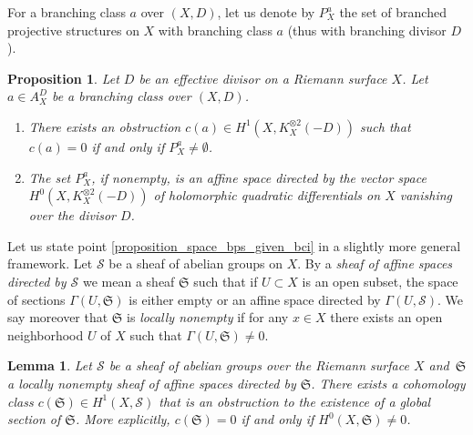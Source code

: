 \documentclass[JEP,XML,SOM,Unicode,NoEqCountersInSection,published]{cedram}
\theoremstyle{definition}
\theoremstyle{plain}
\newtheorem{proposition}[definition]{Proposition}
\newtheorem{lemma}[definition]{Lemma}
\begin{document}
For a branching class $a$ over $(X, D)$, let us denote by $P^a_X$ the set of branched projective structures on $X$ with branching class $a$ (thus with branching divisor $D$).

\begin{proposition}\label{proposition_space_bps_given_bc}
Let $D$ be an effective divisor on a Riemann surface $X$. Let $a \in A_X^D$ be a branching class over $(X, D)$.
\begin{enumerate}
\item\label{proposition_space_bps_given_bci}
There exists an obstruction $c(a) \in H^1\left(X, K_X^{\otimes 2}(-D)\right)$ such that $c(a)=0$ if and only if $P_X^a \neq \emptyset$.
\item\label{proposition_space_bps_given_bcii}
The set $P_X^a$, if nonempty, is an affine space directed by the vector space $H^0\left(X, K_X^{\otimes 2}(-D)\right)$ of holomorphic quadratic differentials on $X$ vanishing over the divisor $D$.
\end{enumerate}
\end{proposition}

Let us state point \eqref{proposition_space_bps_given_bci} in a slightly more general framework.
Let $\mathcal S$ be a sheaf of abelian groups on $X$.
By a \emph{sheaf of affine spaces directed by $\mathcal S$} we mean a sheaf $\mathfrak S$ such that if $U \subset X$ is an open subset, the space of sections $\Gamma(U, \mathfrak S)$ is either empty or an affine space directed by $\Gamma(U, \mathcal S)$.
We say moreover that $\mathfrak S$ is \emph{locally nonempty} if for any $x \in X$ there exists an open neighborhood $U$ of $X$ such that $\Gamma(U, \mathfrak S) \neq 0$.

\begin{lemma}\label{lemma_obstruction_affine_sheaf}
Let $\mathcal S$ be a sheaf of abelian groups over the Riemann surface $X$ and~$\mathfrak S$ a locally nonempty sheaf of affine spaces directed by $\mathfrak S$.
There exists a cohomology class $c(\mathfrak S) \in H^1(X, \mathcal S)$ that is an obstruction to the existence of a global section of $\mathfrak S$. More explicitly, $c(\mathfrak S)=0$ if and only if $H^0(X, \mathfrak S) \neq 0$.
\end{lemma}
\end{document}
